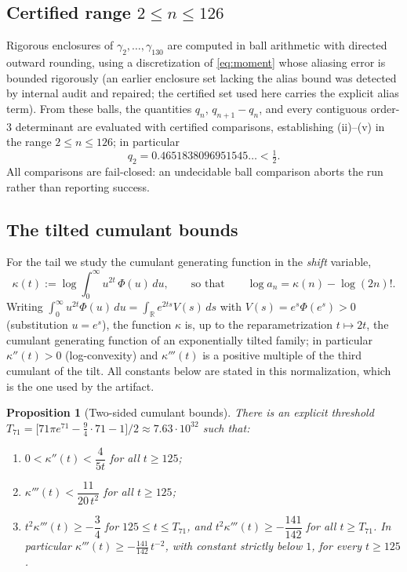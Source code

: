 \documentclass[11pt]{amsart}
\newtheorem{proposition}[theorem]{Proposition}
\theoremstyle{definition}
\theoremstyle{remark}
\begin{document}
\subsection{Certified range \texorpdfstring{$2\le n\le 126$}{2 <= n <= 126}}
Rigorous enclosures of $\gamma_2,\dots,\gamma_{130}$ are computed in
ball arithmetic with directed outward rounding, using a
discretization of \eqref{eq:moment} whose aliasing error is bounded
rigorously (an earlier enclosure set lacking the alias bound was
detected by internal audit and repaired; the certified set used here
carries the explicit alias term). From these balls, the quantities
$q_n$, $q_{n+1}-q_n$, and every contiguous order-$3$ determinant are
evaluated with certified comparisons, establishing (ii)--(v) in the
range $2\le n\le 126$; in particular
\[
q_2=0.4651838096951545\ldots<\tfrac12 .
\]
All comparisons are fail-closed: an undecidable ball comparison aborts
the run rather than reporting success.

\subsection{The tilted cumulant bounds}
For the tail we study the cumulant generating function in the
\emph{shift} variable,
\[
\kappa(t):=\log\int_0^\infty u^{2t}\,\Phi(u)\,du ,
\qquad\text{so that}\qquad
\log a_n=\kappa(n)-\log(2n)! .
\]
Writing $\int_0^\infty u^{2t}\Phi(u)\,du=\int_{\mathbb R}e^{2ts}V(s)\,ds$
with $V(s)=e^{s}\Phi(e^{s})>0$ (substitution $u=e^{s}$), the function
$\kappa$ is, up to the reparametrization $t\mapsto2t$, the cumulant
generating function of an exponentially tilted family; in particular
$\kappa''(t)>0$ (log-convexity) and $\kappa'''(t)$ is a positive
multiple of the third cumulant of the tilt. All constants below are
stated in this normalization, which is the one used by the artifact.

\begin{proposition}[Two-sided cumulant bounds]\label{prop:cumulant}
There is an explicit threshold
$T_{71}=\bigl[71\pi e^{71}-\tfrac94\cdot 71-1\bigr]/2
\approx 7.63\cdot 10^{32}$ such that:
\begin{enumerate}
\item[(i)] $0<\kappa''(t)<\dfrac{4}{5t}$ for all $t\ge 125$;
\item[(ii)] $\kappa'''(t)<\dfrac{11}{20\,t^{2}}$ for all $t\ge 125$;
\item[(iii)] $t^{2}\kappa'''(t)\ge -\dfrac34$ for $125\le t\le T_{71}$,
and $t^{2}\kappa'''(t)\ge -\dfrac{141}{142}$ for all $t\ge T_{71}$.
In particular $\kappa'''(t)\ge -\frac{141}{142}\,t^{-2}$, with constant
strictly below $1$, for every $t\ge 125$.
\end{enumerate}
\end{proposition}
\end{document}
